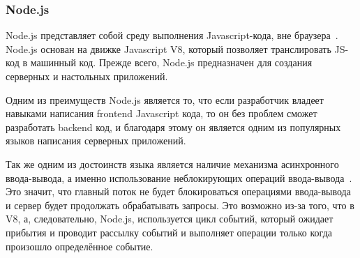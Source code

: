 \subsubsection{Node.js}

Node.js представляет собой среду выполнения Javascript-кода, вне браузера~\cite{node}. Node.js основан на движке Javascript V8, который позволяет транслировать JS-код в машинный код. Прежде всего, Node.js предназначен для создания серверных и настольных приложений.

Одним из преимуществ Node.js является то, что если разработчик владеет навыками написания frontend Javascript кода, то он без проблем сможет разработать backend код, и благодаря этому он является одним из популярных языков написания серверных приложений.

Так же одним из достоинств языка является наличие механизма асинхронного ввода-вывода, а именно использование неблокирующих операций ввода-вывода~\cite{node}. Это значит, что главный поток не будет блокироваться операциями ввода-вывода и сервер будет продолжать обрабатывать запросы. Это возможно из-за того, что в V8, а, следовательно, Node.js, используется цикл событий, который ожидает прибытия и проводит рассылку событий и выполняет операции только когда произошло определённое событие.

